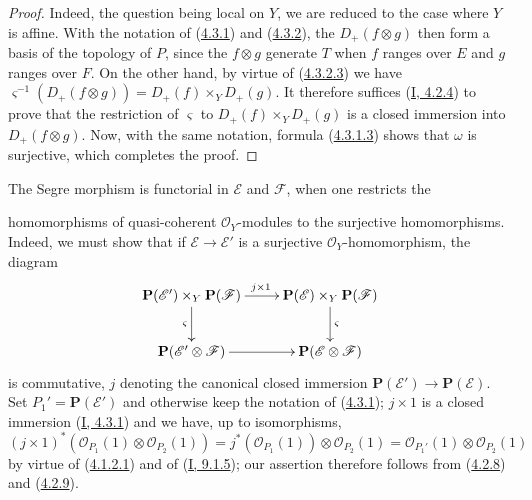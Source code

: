 \begin{proof}
Indeed, the question being local on $Y$, we are reduced to the case where $Y$ is
affine. With the notation of (\hyperref[II.4.3.1]{4.3.1}) and
(\hyperref[II.4.3.2]{4.3.2}), the $D_+(f\otimes g)$ then form a basis
of the topology of $P$, since the $f\otimes g$ generate $T$ when $f$
ranges over $E$ and $g$ ranges over $F$. On the other hand, by virtue of
(\hyperref[II.4.3.2.3]{4.3.2.3}) we have
$\varsigma^{-1}(D_+(f\otimes g))=D_+(f)\times_YD_+(g)$. It therefore suffices
(\hyperref[I.4.2.4]{I, 4.2.4}) to prove that the restriction of
$\varsigma$ to $D_+(f)\times_YD_+(g)$ is a closed immersion into
$D_+(f\otimes g)$. Now, with the same notation, formula
(\hyperref[II.4.3.1.3]{4.3.1.3}) shows that $\omega$ is surjective, which
completes the proof.
\end{proof}

\begin{env}[4.3.4]
\label{II.4.3.4}
The Segre morphism is functorial in $\mathcal{E}$ and $\mathcal{F}$,
when one restricts the


homomorphisms of quasi-coherent $\mathcal{O}_Y$-modules to the surjective
homomorphisms. Indeed, we must show that if
$\mathcal{E}\to\mathcal{E}'$ is a surjective $\mathcal{O}_Y$-homomorphism,
the diagram
\[
  \xymatrix{
    \mathbf{P}(\mathcal{E}')\times_Y\mathbf{P}(\mathcal{F})
      \ar[r]^{j\times1} \ar[d]_{\varsigma}
    & \mathbf{P}(\mathcal{E})\times_Y\mathbf{P}(\mathcal{F})
      \ar[d]^{\varsigma}
    \\\mathbf{P}(\mathcal{E}'\otimes\mathcal{F}) \ar[r]
    & \mathbf{P}(\mathcal{E}\otimes\mathcal{F})
  }
\]
is commutative, $j$ denoting the canonical closed immersion
$\mathbf{P}(\mathcal{E}')\to\mathbf{P}(\mathcal{E})$. Set
$P_1'=\mathbf{P}(\mathcal{E}')$ and otherwise keep the notation of
(\hyperref[II.4.3.1]{4.3.1}); $j\times1$ is a closed immersion
(\hyperref[I.4.3.1]{I, 4.3.1}) and we have, up to isomorphisms,
\[
  (j\times1)^*(\mathcal{O}_{P_1}(1)\otimes\mathcal{O}_{P_2}(1))
  =j^*(\mathcal{O}_{P_1}(1))\otimes\mathcal{O}_{P_2}(1)
  =\mathcal{O}_{P_1'}(1)\otimes\mathcal{O}_{P_2}(1)
\]
by virtue of (\hyperref[II.4.1.2.1]{4.1.2.1}) and of
(\hyperref[I.9.1.5]{I, 9.1.5}); our assertion therefore follows from
(\hyperref[II.4.2.8]{4.2.8}) and
(\hyperref[II.4.2.9]{4.2.9}).
\end{env}

